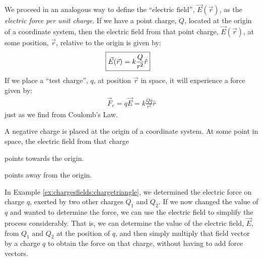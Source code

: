 We proceed in an analogous way to define the ``electric field'', $\vec E(\vec r)$, as the \textit{electric force per unit charge}. If we have a point charge, $Q$, located at the origin of a coordinate system, then the electric field from that point charge, $\vec E(\vec r)$, at some position, $\vec r$, relative to the origin is given by:
\begin{align*}
\Aboxed{\vec E(\vec r) = k\frac{Q}{r^2}\hat r}
\end{align*}
If we place a ``test charge'', $q$, at position $\vec r$ in space, it will experience a force given by:
\begin{align*}
\vec F_e=q\vec E=k\frac{Qq}{r^2}\hat r
\end{align*}
just as we find from Coulomb's Law. 
\begin{checkpoint}\label{cp:chargesfields:edirection}
\begin{MCquestion}{A negative charge is placed at the origin of a coordinate system. At some point in space, the electric field from that charge}
\item points towards the origin. \correct
\item points away from the origin.
\end{MCquestion}
\end{checkpoint}
In Example \ref{ex:chargesfields:chargetriangle}, we determined the electric force on charge $q$, exerted by two other charges $Q_1$ and $Q_2$. If we now changed the value of $q$ and wanted to determine the force, we can use the electric field to simplify the process considerably. That is, we can determine the value of the electric field, $\vec E$, from $Q_1$ and $Q_2$ at the position of $q$, and then simply multiply that field vector by a charge $q$ to obtain the force on that charge, without having to add force vectors.
